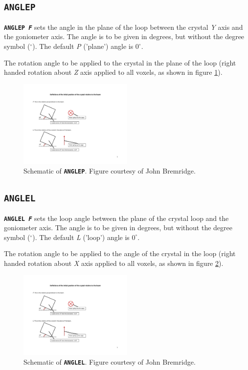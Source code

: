 \documentclass[a4paper]{article}
\newcommand{\Keyword}[1]{\texttt{\textbf{#1}}\xspace}
\begin{document}
\subsection{\Keyword{ANGLEP}}
\label{anglep}
\noindent \Keyword{ANGLEP \textit{F}}
sets the angle in the plane of the loop between the crystal \textit{Y} axis and the goniometer axis. The angle is to be given in degrees, but without the degree symbol ($^\circ$). The default \textit{P} ('plane') angle is $0^\circ$.

The rotation angle to be applied to the crystal in the plane of the loop (right handed rotation about \textit{Z} axis applied to all voxels, as shown in figure \ref{fig:angleP}).
\begin{figure}[h!]
\centering
\includegraphics[width=0.5\textwidth]{Figs-for-Markus-from-JB-19-5-13-1.pdf}
\caption{Schematic of \Keyword{ANGLEP}. Figure courtesy of John Bremridge.}
\label{fig:angleP}
\end{figure}

\subsection{\Keyword{ANGLEL}}

\noindent \Keyword{ANGLEL \textit{F}}
sets the loop angle between the plane of the crystal loop and the goniometer axis. The angle is to be given in degrees, but without the degree symbol ($^\circ$). The default \textit{L} ('loop') angle is $0^\circ$.

The rotation angle to be applied to the angle of the crystal in the loop (right handed rotation about \textit{X} axis applied to all voxels, as shown in figure \ref{fig:angleL}).
\begin{figure}[h!]
\centering
\includegraphics[width=0.5\textwidth]{Figs-for-Markus-from-JB-19-5-13-2.pdf}
\caption{Schematic of \Keyword{ANGLEL}. Figure courtesy of John Bremridge.}
\label{fig:angleL}
\end{figure}
\end{document}
